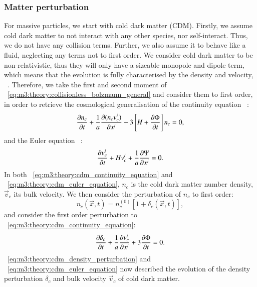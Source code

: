 \subsubsection{Matter perturbation}
    For massive particles, we start with cold dark matter (CDM). Firstly, we assume cold dark matter to not interact with any other species, nor self-interact. Thus, we do not have any collision terms. Further, we also assume it to behave like a fluid, neglecting any terms not to first order. We consider cold dark matter to be non-relativistic, thus they will only have a sizeable monopole and dipole term, which means that the evolution is fully characterised by the density and velocity, ~\cite{AST5220LectureNotes}. Therefore, we take the first and second moment of ~\cref{eq:m3:theory:collisionless_bolzmann_general} and consider them to first order, in order to retrieve the cosmological generalisation of the continuity equation ~\cite[Eq. 5.41]{dodelson2020modern}:
    \begin{equation}\label{eq:m3:theory:cdm_continuity_equation}
        \pdv{n_c}{t}+\frac{1}{a}\pdv{(n_cv_c^i)}{x^i} + 3\left[H+\pdv{\Phi}{t}\right]n_c=0,
    \end{equation}
    and the Euler equation ~\cite[Eq. 5.50]{dodelson2020modern}:
    \begin{equation}\label{eq:m3:theory:cdm_euler_equation}
        \pdv{v_c^i}{t} + Hv_c^i + \frac{1}{a}\pdv{\Psi}{x^i} = 0.
    \end{equation}
    In both ~\cref{eq:m3:theory:cdm_continuity_equation} and ~\cref{eq:m3:theory:cdm_euler_equation}, $n_c$ is the cold dark matter number density, $\vec{v}_c$ its bulk velocity. We then consider the perturbation of $n_c$ to first order:
    \begin{equation}\label{eq:m3:theory:cdm_number_density_perturbation}
        n_c(\vec{x}, t) = n_c^{(0)}[1+\delta_c(\vec{x},t)],
    \end{equation}
    and consider the first order perturbation to ~\cref{eq:m3:theory:cdm_continuity_equation}:
    \begin{equation}\label{eq:m3:theory:cdm_density_perturbation}
        \pdv{\delta_c}{t}+\frac{1}{a}\pdv{v_c^i}{x^i} + 3\pdv{\Phi}{t} = 0.
    \end{equation}
    ~\cref{eq:m3:theory:cdm_density_perturbation} and ~\cref{eq:m3:theory:cdm_euler_equation} now described the evolution of the density perturbation $\delta_c$ and bulk velocity $\vec{v}_c$ of cold dark matter.

